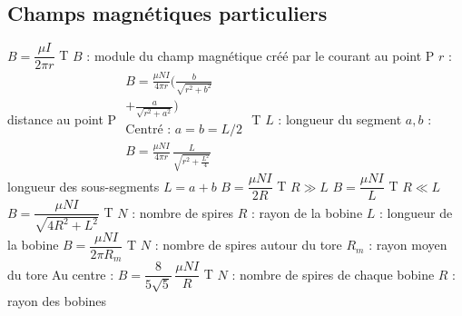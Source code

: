 \subsection{Champs magnétiques particuliers}
\begin{formules}
    {$B = \dfrac{\mu I}{2\pi r}$}
    {T}
    {
     $B$ : module du champ magnétique créé par le courant au point P \newline
     $r$ : distance au point P}
    {$\begin{gathered}
      B = \frac{\mu NI}{4\pi r}\biggl(\frac{b}{\sqrt{r^2+b^2}} \\
      + \frac{a}{\sqrt{r^2+a^2}}\biggr) \\
      \text{Centré : } a = b = L/2 \\
      B = \frac{\mu NI}{4\pi r}\,\frac{L}{\sqrt{r^2+\frac{L^2}{4}}}
     \end{gathered}$}
    {T}
    {
     $L$ : longueur du segment \newline
     $a, b$ : longueur des sous-segments \newline
     $L = a + b$}
    {$B = \dfrac{\mu NI}{2R}$}
    {T}
    {$R \gg L$ }
    {$B = \dfrac{\mu NI}{L}$}
    {T}
    { $R \ll L$}
    {$B = \dfrac{\mu NI}{\sqrt{4R^2 + L^2}}$}
    {T}
    {$N$ : nombre de spires \newline
     $R$ : rayon de la bobine \newline
     $L$ : longueur de la bobine}
    {$B = \dfrac{\mu NI}{2\pi R_m}$}
    {T}
    {
     $N$ : nombre de spires autour du tore \newline
     $R_m$ : rayon moyen du tore}
    {Au centre : \newline
     $B = \dfrac{8}{5\sqrt5}\,\dfrac{\mu NI}{R}$}
    {T}
    {
     $N$ : nombre de spires de chaque bobine \newline
     $R$ : rayon des bobines}
\end{formules}

